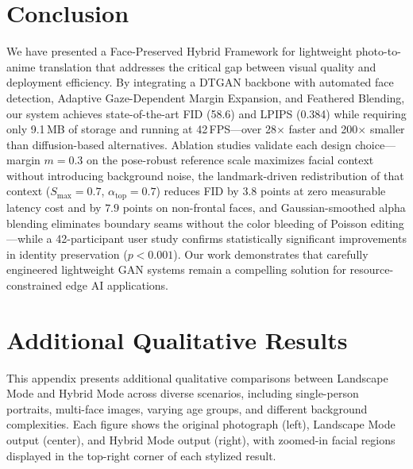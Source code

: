 \documentclass[journal]{IEEEtran}
\begin{document}
\section{Conclusion}
\label{sec:conclusion}

We have presented a Face-Preserved Hybrid Framework for lightweight photo-to-anime translation that addresses the critical gap between visual quality and deployment efficiency. By integrating a DTGAN backbone with automated face detection, Adaptive Gaze-Dependent Margin Expansion, and Feathered Blending, our system achieves state-of-the-art FID (58.6) and LPIPS (0.384) while requiring only 9.1\,MB of storage and running at 42\,FPS---over 28$\times$ faster and 200$\times$ smaller than diffusion-based alternatives. Ablation studies validate each design choice---margin $m = 0.3$ on the pose-robust reference scale maximizes facial context without introducing background noise, the landmark-driven redistribution of that context ($S_{\max} = 0.7$, $\alpha_{\text{top}} = 0.7$) reduces FID by $3.8$ points at zero measurable latency cost and by $7.9$ points on non-frontal faces, and Gaussian-smoothed alpha blending eliminates boundary seams without the color bleeding of Poisson editing---while a 42-participant user study confirms statistically significant improvements in identity preservation ($p < 0.001$). Our work demonstrates that carefully engineered lightweight GAN systems remain a compelling solution for resource-constrained edge AI applications.






\appendices
\section{Additional Qualitative Results}
\label{appendix:qualitative}

This appendix presents additional qualitative comparisons between Landscape Mode and Hybrid Mode across diverse scenarios, including single-person portraits, multi-face images, varying age groups, and different background complexities. Each figure shows the original photograph (left), Landscape Mode output (center), and Hybrid Mode output (right), with zoomed-in facial regions displayed in the top-right corner of each stylized result.
\end{document}
